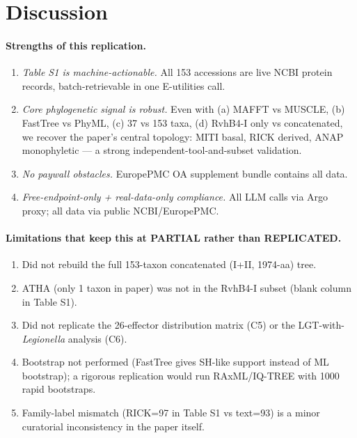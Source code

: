 \documentclass[11pt,letterpaper]{article}
\begin{document}
\section{Discussion}

\paragraph{Strengths of this replication.}
\begin{enumerate}[leftmargin=1.6em]
  \item \emph{Table S1 is machine-actionable.} All 153 accessions are live NCBI protein records,
    batch-retrievable in one E-utilities call.
  \item \emph{Core phylogenetic signal is robust.} Even with (a) MAFFT vs MUSCLE,
    (b) FastTree vs PhyML, (c) 37 vs 153 taxa, (d) RvhB4-I only vs concatenated, we recover
    the paper's central topology: MITI basal, RICK derived, ANAP monophyletic ---
    a strong independent-tool-and-subset validation.
  \item \emph{No paywall obstacles.} EuropePMC OA supplement bundle contains all data.
  \item \emph{Free-endpoint-only + real-data-only compliance.} All LLM calls via Argo proxy;
    all data via public NCBI/EuropePMC.
\end{enumerate}

\paragraph{Limitations that keep this at PARTIAL rather than REPLICATED.}
\begin{enumerate}[leftmargin=1.6em]
  \item Did not rebuild the full 153-taxon concatenated (I+II, 1974-aa) tree.
  \item ATHA (only 1 taxon in paper) was not in the RvhB4-I subset (blank column in Table S1).
  \item Did not replicate the 26-effector distribution matrix (C5) or the LGT-with-\emph{Legionella}
    analysis (C6).
  \item Bootstrap not performed (FastTree gives SH-like support instead of ML bootstrap);
    a rigorous replication would run RAxML/IQ-TREE with 1000 rapid bootstraps.
  \item Family-label mismatch (RICK=97 in Table S1 vs text=93) is a minor curatorial
    inconsistency in the paper itself.
\end{enumerate}
\end{document}
